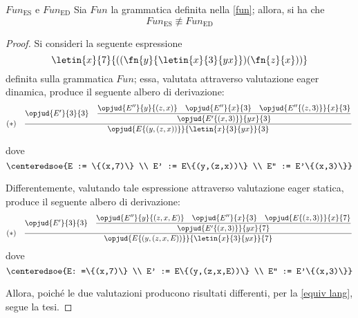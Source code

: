 \documentclass[a4paper, 12pt]{report}
\begin{document}
    \begin{framedlem}[label={fun lemma pt1}]{$Fun_\mathrm{ES}$ e $Fun_\mathrm{ED}$}
        Sia $Fun$ la grammatica definita nella \cref{fun}; allora, si ha che $$Fun_\mathrm{ES} \not\equiv Fun_\mathrm{ED}$$
    \end{framedlem}

    \begin{proof}
        Si consideri la seguente espressione $$\letin{x}{7}{((\fn{y}{\letin{x}{3}{yx}})(\fn{z}{x}))}$$ definita sulla grammatica $Fun$; essa, valutata attraverso valutazione eager dinamica, produce il seguente albero di derivazione: $$(*) \quad \dfrac{\opjud{E'}{3}{3} \quad \dfrac{\opjud{E''}{y}{(z,x)} \quad \opjud{E''}{x}{3} \quad \opjud{E''\{(z,3)\}}{x}{3}}{\opjud{E'\{(x,3)\}}{yx}{3}}}{\opjud{E\{(y,(z,x))\}}{\letin{x}{3}{yx}}{3}}$$ 

        dove $$\centeredsoe{E := \{(x,7)\} \\ E' := E\{(y,(z,x))\} \\ E'' := E'\{(x,3)\}}$$

        Differentemente, valutando tale espressione attraverso valutazione eager statica, produce il seguente albero di derivazione: $$(*) \quad \dfrac{\opjud{E'}{3}{3} \quad \dfrac{\opjud{E''}{y}{(z,x,E)} \quad \opjud{E''}{x}{3} \quad \opjud{E\{(z,3)\}}{x}{7}}{\opjud{E'\{(x,3)\}}{yx}{7}}}{\opjud{E\{(y,(z,x,E))\}}{\letin{x}{3}{yx}}{7}}$$  dove $$\centeredsoe{E: =\{(x,7)\} \\ E' := E\{(y,(z,x,E))\} \\ E'' := E'\{(x,3)\}}$$

        Allora, poiché le due valutazioni producono risultati differenti, per la \cref{equiv lang}, segue la tesi.
    \end{proof}
\end{document}
